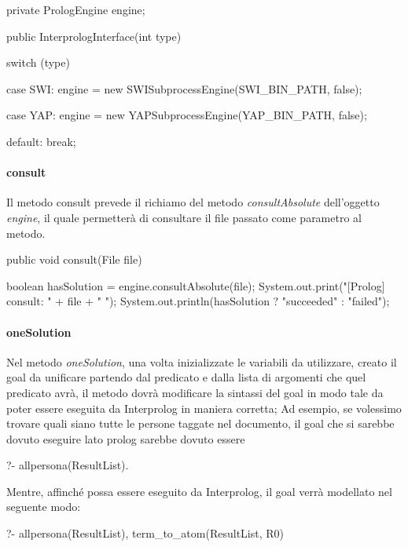 \begin{javacode}
    private PrologEngine engine;

    public InterprologInterface(int type) {

        switch (type) {
            case SWI:
            engine = new SWISubprocessEngine(SWI_BIN_PATH, false);

            case YAP:
            engine = new YAPSubprocessEngine(YAP_BIN_PATH, false);

            default:
            break;
        }
    }
\end{javacode}
\paragraph{consult}
Il metodo consult prevede il richiamo del metodo \emph{consultAbsolute} dell'oggetto \emph{engine}, il quale permetterà di consultare il file passato come parametro al metodo.

\begin{javacode}
    public void consult(File file) {

        boolean hasSolution = engine.consultAbsolute(file);
        System.out.print("[Prolog] consult: " + file + " ");
        System.out.println(hasSolution ? "succeeded" : "failed");
    }
\end{javacode}
\paragraph{oneSolution}
Nel metodo \emph{oneSolution}, una volta inizializzate le variabili da utilizzare, creato il goal da unificare partendo dal predicato e dalla lista di argomenti che quel predicato avrà, il metodo dovrà modificare la sintassi del goal in modo tale da poter essere eseguita da Interprolog in maniera corretta; 
Ad esempio, se volessimo trovare quali siano tutte le persone taggate nel documento, il goal che si sarebbe dovuto eseguire lato prolog sarebbe dovuto essere

\begin{prologcode}
	?- allpersona(ResultList).
\end{prologcode}

Mentre, affinché possa essere eseguito da Interprolog, il goal verrà modellato nel seguente modo:

\begin{prologcode}
	?- allpersona(ResultList), term_to_atom(ResultList, R0)
\end{prologcode}

